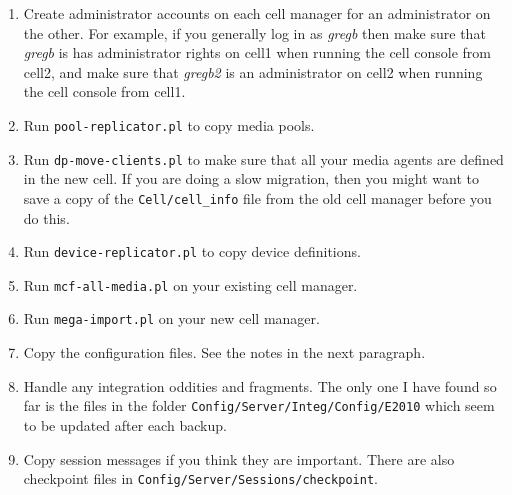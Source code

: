 \documentclass{article}
\begin{document}
\begin{enumerate}
\item Create administrator accounts on each cell manager for an administrator on the other. For example, if you generally log in as {\it gregb} then make sure that {\it gregb} is has administrator rights on {\sf cell1} when running the cell console from {\sf cell2}, and make sure that {\it gregb2} is an administrator on {\sf cell2} when running the cell console from {\sf cell1}.
\item Run {\tt pool-replicator.pl} to copy media pools.
\item Run {\tt dp-move-clients.pl} to make sure that all your media agents are defined in the new cell. If you are doing a slow migration, then you might want to save a copy of the {\tt Cell/cell\_info} file from the old cell manager before you do this.
\item Run {\tt device-replicator.pl} to copy device definitions.
\item Run {\tt mcf-all-media.pl} on your existing cell manager. 
\item Run {\tt mega-import.pl} on your new cell manager.
\item Copy the configuration files. See the notes in the next paragraph.
\item Handle any integration oddities and fragments. The only one I have found so far is the files in the folder {\tt Config/Server/Integ/Config/E2010} which seem to be updated after each backup.
\item Copy session messages if you think they are important. There are also checkpoint files in {\tt Config/Server/Sessions/checkpoint}.
\end{enumerate}
\end{document}
